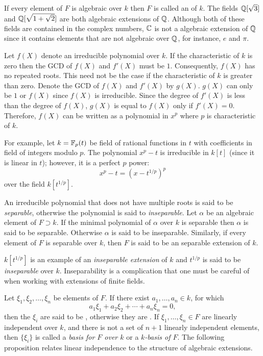 If every element of $F$ is algebraic over $k$ then $F$ is called an
 of $k$.  The fields $\mathbb{Q}[\sqrt{3}]$ and
$\mathbb{Q}[\sqrt{1+\sqrt{2}}]$ are both algebraic extensions of $\mathbb{Q}$.  Although
both of these fields are contained in the complex numbers, $\mathbb{C}$ is not a
algebraic extension of $\mathbb{Q}$ since it contains elements that are not
algebraic over $\mathbb{Q}$, for instance, $e$ and $\pi$.

Let $f(X)$ denote an irreducible polynomial over $k$.  If the
characteristic of $k$ is zero then the GCD of $f(X)$ and $f'(X)$ must
be $1$.  Consequently, $f(X)$ has no repeated roots.  This need not be
the case if the characteristic of $k$ is greater than zero.  Denote the
GCD of $f(X)$ and $f'(X)$ by $g(X)$.  $g(X)$ can only be $1$ or $f(X)$
since $f(X)$ is irreducible.  Since the degree of $f'(X)$ is less than
the degree of $f(X)$, $g(X)$ is equal to $f(X)$ only if $f'(X) = 0$.
Therefore, $f(X)$ can be written as a polynomial in $x^p$ where $p$ is
characteristic of $k$.

For example, let $k = \mathbb{F}_p(t)$ be field of rational functions in $t$ with
coefficients in field of integers modulo $p$.  The polynomial $x^p-t$ is
irreducible in $k[t]$ (since it is linear in $t$); however, it is a
perfect $p$\th{} power:
\[
x^p-t = (x - t^{1/p})^p
\]
over the field $k[t^{1/p}]$.

An irreducible polynomial that does not have multiple roots is said to
be {\em separable\/}, otherwise the
polynomial is said to {\em inseparable\/}. Let $\alpha$ be an algebraic element of $F \supset k$.  If
the minimal polynomial of $\alpha$ over $k$ is separable then $\alpha$
is said to be separable.  Otherwise $\alpha$ is said to be inseparable.
Similarly, if every element of $F$ is separable over $k$, then $F$ is
said to be an separable extension of $k$.

$k[t^{1/p}]$ is an example of an {\em inseparable extension} of $k$ and
$t^{1/p}$ is said to be {\em inseparable} over $k$.  Inseparability is a complication that one
must be careful of when working with extensions of finite fields.

\medskip
Let $\xi_1, \xi_2, \ldots, \xi_n$ be elements of $F$.  If there
exist $a_1, \ldots, a_n \in k$, for which 
\[
a_1 \xi_1 + a_2 \xi_2 + \cdots + a_n \xi_n = 0,
\]
then the $\xi_i$ are said to be , otherwise they
are .  If $\xi_1, \ldots, \xi_n \in F$ are
linearly independent over $k$, and there is not a set of $n+1$ linearly
independent elements, then $\{\xi_i\}$ is called a {\em basis for $F$ over
$k$} or a {\em $k$-basis of $F$}. The following
proposition relates linear independence to the structure of algebraic
extensions.

